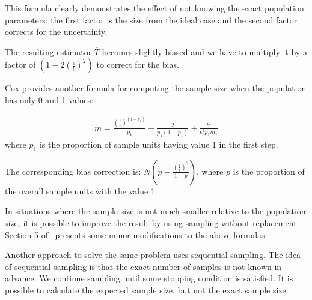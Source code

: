 \documentclass{article}
\begin{document}
  This formula clearly demonstrates the effect of not knowing the
  exact population parameters: the first factor is the size from the
  ideal case and the second factor corrects for the uncertainty.

  The resulting estimator $\overline{T}$ becomes slightly biased and we
  have to multiply it by a factor of $(1-2(\frac{\epsilon}{t})^2)$ to
  correct for the bias.

  Cox provides another formula for computing the sample size when the
  population has only 0 and 1 values:

  \begin{eqnarray*}
    m = \frac{(\frac{t}{\epsilon})^(1-p_1)}{p_1} + \frac{2}{p_1(1-p_1)}
    + \frac{t^2}{\epsilon^2p_1m_1}
  \end{eqnarray*}
  where $p_1$ is the proportion of sample units having value 1 in the
  first step.

  The corresponding bias correction is:
  $N(p-\frac{(\frac{\epsilon}{t})^2}{1-p})$, where $p$ is the
  proportion of the overall sample units with the value 1.

  In situations where the sample size is not much smaller relative to
  the population size, it is possible to improve the result by using
  sampling without replacement. Section 5 of~\cite{hou91error}
  presents some minor modifications to the above formulas.

  Another approach to solve the same problem uses sequential
  sampling. The idea of sequential sampling is that the exact number
  of samples is not known in advance. We continue sampling until some
  stopping condition is satisfied. It is possible to calculate the
  expected sample size, but not the exact sample size.

  
\end{document}
